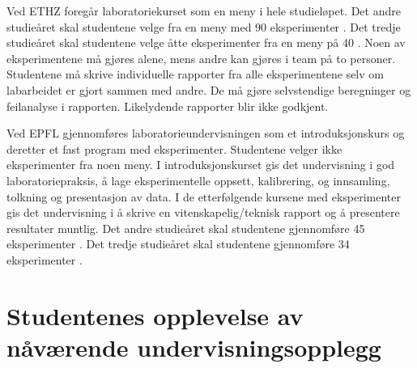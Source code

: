 \documentclass{article}
\begin{document}

Ved ETHZ foregår laboratoriekurset som en meny i hele studieløpet. Det andre studieåret skal studentene velge fra en meny med 90 eksperimenter \cite{ETHZ_90}.  Det tredje studieåret skal studentene velge åtte eksperimenter fra en meny på 40 \cite{ETHZ_40}. Noen av eksperimentene må gjøres alene, mens andre kan gjøres i team på to personer. Studentene må skrive individuelle rapporter fra alle eksperimentene selv om labarbeidet er gjort sammen med andre. De må gjøre selvstendige beregninger og feilanalyse i rapporten. Likelydende rapporter blir ikke godkjent. 



Ved EPFL gjennomføres laboratorieundervisningen som et introduksjonskurs og deretter et fast program med eksperimenter. Studentene velger ikke eksperimenter fra noen meny. I introduksjonskurset gis det undervisning i god laboratoriepraksis, å lage eksperimentelle oppsett, kalibrering, og innsamling, tolkning og presentasjon av data. I de etterfølgende kursene med eksperimenter gis det undervisning i å skrive en vitenskapelig/teknisk rapport og å presentere resultater muntlig. 
Det andre studieåret skal studentene gjennomføre 45 eksperimenter \cite{EPFL_45}. Det tredje studieåret skal studentene gjennomføre 34 eksperimenter \cite{EPFL_34}. 



\section{Studentenes opplevelse av nåværende undervisningsopplegg}
\end{document}
